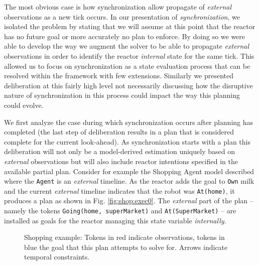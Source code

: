 The most obvious case is how synchronization allow propagate of {\em
  external} observations as a new tick occurs. In our presentation of 
{\em synchronization}, we isolated the problem by stating
that we will assume at this point that the reactor has no future goal
or more accurately no plan to enforce. By doing so we
were able to develop the way we augment the \eu solver to be able
to propagate {\em external} observations in order to identify the
reactor {\em internal} state for the same tick. This allowed us 
to focus on synchronization as a state evaluation process that can
be resolved within the \eu framework with few extensions. Similarly
we presented deliberation at this fairly high level not necessarily
discussing how the disruptive nature of synchronization in this
process could impact the way this planning could evolve.

We first analyze the case during which synchronization occurs after
planning has completed (\ie the last step of deliberation results in a
plan that is considered complete for the current look-ahead). As
synchronization starts with a plan %
this deliberation will not only be a model-derived estimation uniquely
based on {\em external} observations but will also include reactor
intentions specified in the available partial plan. Consider for
example the Shopping Agent model described where the \texttt{Agent} is
an {\em external} timeline. As the reactor adds the goal to
\texttt{Own} milk and the current {\em external} timeline indicates
that the robot was \texttt{At(home)}, it produces a plan as shown in
Fig. \ref{fig:shop:exec0}. The {\em external} part of the plan --
namely the tokens \texttt{Going(home, superMarket)} and
\texttt{At(SuperMarket)} -- are installed as goals for the reactor
managing this state variable {\em internally}.

\begin{figure}[!htb]
  \centering
    \caption{\small Shopping example: Tokens in red indicate
      observations, tokens in blue the goal that this plan attempts to
      solve for. Arrows indicate temporal constraints. }
  \label{fig:shop:exec}
\end{figure}

